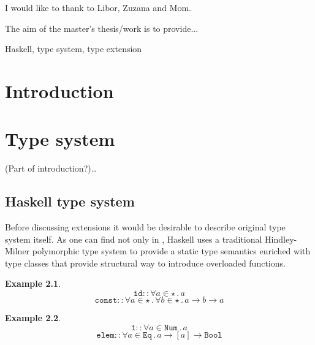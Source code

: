 \documentclass[11pt,oneside,draft]{fithesis2}
\newtheorem{example}{Example}
\begin{document}
\FrontMatter
\ThesisTitlePage

\begin{ThesisDeclaration}
\DeclarationText
\AdvisorName
\end{ThesisDeclaration}

\begin{ThesisThanks}
I would like to thank to Libor, Zuzana and Mom.
\end{ThesisThanks}

\begin{ThesisAbstract}
The aim of the master's thesis/work is to provide...
\end{ThesisAbstract}

\begin{ThesisKeyWords}
Haskell, type system, type extension
\end{ThesisKeyWords}

\tableofcontents

\MainMatter

\chapter{Introduction}

\chapter{Type system}

(Part of introduction?)\dots

\section{Haskell type system}

Before discussing extensions it would be desirable to describe
original type system itself.
As one can find not only in \cite{haskell2010}, Haskell uses a traditional
Hindley-Milner polymorphic type system to provide a static type
semantics enriched with type classes that provide structural way to
introduce overloaded functions.

\begin{example}~
\[ \texttt{id} :: \forall a \in {\star} \, . \, a \]
\[ \texttt{const} :: \forall a \in {\star} \, . \, \forall b \in {\star} \, . \, a \to b \to a \]
\end{example}

\begin{example}~
\[ \texttt{1} :: \forall a \in \texttt {Num} \, . \, a \]
\[ \texttt{elem} :: \forall a \in \texttt{Eq} \, . \, a \to [a] \to \texttt{Bool} \]
\end{example}
\end{document}
